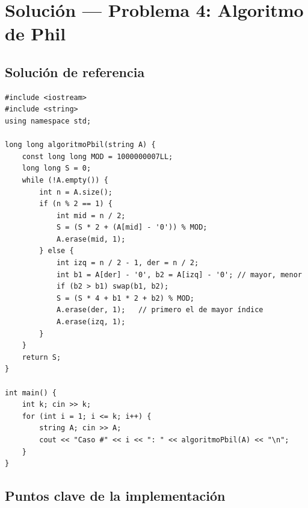 \documentclass[12pt, oneside]{article}
\begin{document}
\newpage

\section{Solución — Problema 4: Algoritmo de Phil}

\subsection{Solución de referencia}

\begin{notaprofesor}
\begin{verbatim}
#include <iostream>
#include <string>
using namespace std;

long long algoritmoPbil(string A) {
    const long long MOD = 1000000007LL;
    long long S = 0;
    while (!A.empty()) {
        int n = A.size();
        if (n % 2 == 1) {
            int mid = n / 2;
            S = (S * 2 + (A[mid] - '0')) % MOD;
            A.erase(mid, 1);
        } else {
            int izq = n / 2 - 1, der = n / 2;
            int b1 = A[der] - '0', b2 = A[izq] - '0'; // mayor, menor
            if (b2 > b1) swap(b1, b2);
            S = (S * 4 + b1 * 2 + b2) % MOD;
            A.erase(der, 1);   // primero el de mayor índice
            A.erase(izq, 1);
        }
    }
    return S;
}

int main() {
    int k; cin >> k;
    for (int i = 1; i <= k; i++) {
        string A; cin >> A;
        cout << "Caso #" << i << ": " << algoritmoPbil(A) << "\n";
    }
}
\end{verbatim}
\end{notaprofesor}

\subsection{Puntos clave de la implementación}
\end{document}
